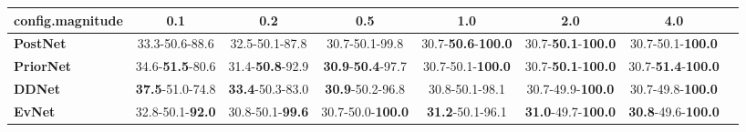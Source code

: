 \begin{tabular}{lccccccc}
\toprule
\textbf{config.magnitude} &                      0.1 &                      0.2 &                               0.5 &                                1.0 &                                2.0 &                                4.0 \\
\midrule
\textbf{PostNet } &           33.3-50.6-88.6 &           32.5-50.1-87.8 &                    30.7-50.1-99.8 &  30.7-\textbf{50.6}-\textbf{100.0} &  30.7-\textbf{50.1}-\textbf{100.0} &           30.7-50.1-\textbf{100.0} \\
\textbf{PriorNet} &  34.6-\textbf{51.5}-80.6 &  31.4-\textbf{50.8}-92.9 &  \textbf{30.9}-\textbf{50.4}-97.7 &           30.7-50.1-\textbf{100.0} &  30.7-\textbf{50.1}-\textbf{100.0} &  30.7-\textbf{51.4}-\textbf{100.0} \\
\textbf{DDNet   } &  \textbf{37.5}-51.0-74.8 &  \textbf{33.4}-50.3-83.0 &           \textbf{30.9}-50.2-96.8 &                     30.8-50.1-98.1 &           30.7-49.9-\textbf{100.0} &           30.7-49.8-\textbf{100.0} \\
\textbf{EvNet   } &  32.8-50.1-\textbf{92.0} &  30.8-50.1-\textbf{99.6} &          30.7-50.0-\textbf{100.0} &            \textbf{31.2}-50.1-96.1 &  \textbf{31.0}-49.7-\textbf{100.0} &  \textbf{30.8}-49.6-\textbf{100.0} \\
\bottomrule
\end{tabular}
